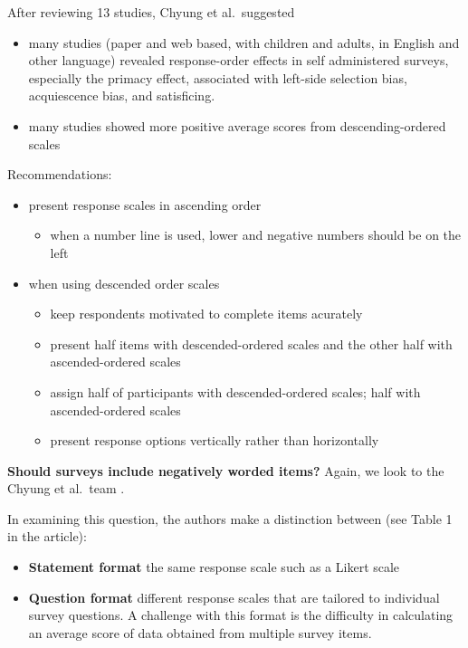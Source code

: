 \documentclass[
  english,
]{book}
\providecommand{\tightlist}{%
  \setlength{\itemsep}{0pt}\setlength{\parskip}{0pt}}
\begin{document}
After reviewing 13 studies, Chyung et al.~suggested

\begin{itemize}
\tightlist
\item
  many studies (paper and web based, with children and adults, in English and other language) revealed response-order effects in self administered surveys, especially the primacy effect, associated with left-side selection bias, acquiescence bias, and satisficing.
\item
  many studies showed more positive average scores from descending-ordered scales
\end{itemize}

Recommendations:

\begin{itemize}
\tightlist
\item
  present response scales in ascending order

  \begin{itemize}
  \tightlist
  \item
    when a number line is used, lower and negative numbers should be on the left
  \end{itemize}
\item
  when using descended order scales

  \begin{itemize}
  \tightlist
  \item
    keep respondents motivated to complete items acurately
  \item
    present half items with descended-ordered scales and the other half with ascended-ordered scales
  \item
    assign half of participants with descended-ordered scales; half with ascended-ordered scales
  \item
    present response options vertically rather than horizontally
  \end{itemize}
\end{itemize}

\textbf{Should surveys include negatively worded items?} Again, we look to the Chyung et al.~team \citep{chyung_evidencebased_2018}.

In examining this question, the authors make a distinction between (see Table 1 in the article):

\begin{itemize}
\tightlist
\item
  \textbf{Statement format} the same response scale such as a Likert scale
\item
  \textbf{Question format} different response scales that are tailored to individual survey questions. A challenge with this format is the difficulty in calculating an average score of data obtained from multiple survey items.
\end{itemize}
\end{document}
